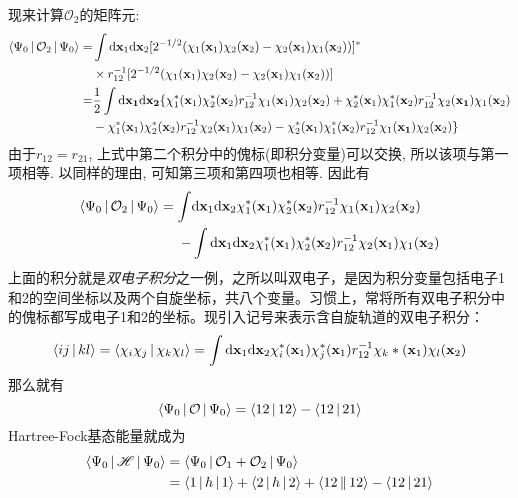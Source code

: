 
现来计算$\mathcal{O}_2$的矩阵元:
\begin{align}
\braket{\Psi_0|\mathcal{O}_2|\Psi_0}=&\int\dd\mathbf{x}_1\dd\mathbf{x}_2[2^{-1/2}(\chi_1(\mathbf{x}_1)\chi_2(\mathbf{x}_2)-\chi_2(\mathbf{x}_1)\chi_1(\mathbf{x}_2))]^*\notag\\
\qquad&\times r_{12}^{-1} [2^{-1/2}(\chi_1(\mathbf{x}_1)\chi_2(\mathbf{x}_2)-\chi_2(\mathbf{x}_1)\chi_1(\mathbf{x}_2))]\notag\\
=&\frac{1}{2}\int\dd{\mathbf{x}_1}\dd{\mathbf{x}_2}\{\chi_1^*(\mathbf{x}_1)\chi_2^*(\mathbf{x}_2)r_{12}^{-1}\chi_1(\mathbf{x}_1)\chi_2(\mathbf{x}_2) + \chi_2^*(\mathbf{x}_1)\chi_1^*(\mathbf{x}_2)r_{12}^{-1}\chi_2(\mathbf{x_1})\chi_1(\mathbf{x}_2) \notag\\
\qquad& - \chi_1^*(\mathbf{x}_1)\chi_2^*(\mathbf{x}_2)r_{12}^{-1}\chi_2(\mathbf{x}_1)\chi_1(\mathbf{x}_2) - \chi_2^*(\mathbf{x}_1)\chi_1^*(\mathbf{x}_2)r_{12}^{-1}\chi_1(\mathbf{x_1})\chi_2(\mathbf{x}_2)
\}
\end{align}
由于$r_{12}=r_{21}$, 上式中第二个积分中的傀标(即积分变量)可以交换, 所以该项与第一项相等. 以同样的理由, 可知第三项和第四项也相等. 因此有
\begin{align}
\braket{\Psi_0|\mathcal{O}_2|\Psi_0}=\int&\dd\mathbf{x}_1\dd\mathbf{x}_2 \chi_1^*(\mathbf{x}_1)\chi_2^*(\mathbf{x}_2)r_{12}^{-1}\chi_1(\mathbf{x}_1)\chi_2(\mathbf{x}_2)\notag\\
 -& \int\dd\mathbf{x}_1\dd\mathbf{x}_2\chi_1^*(\mathbf{x}_1)\chi_2^*(\mathbf{x}_2)r_{12}^{-1}\chi_2(\mathbf{x}_1)\chi_1(\mathbf{x}_2)
\end{align}
上面的积分就是\emph{双电子积分}之一例，之所以叫双电子，是因为积分变量包括电子1和2的空间坐标以及两个自旋坐标，共八个变量。习惯上，常将所有双电子积分中的傀标都写成电子1和2的坐标。现引入记号来表示含自旋轨道的双电子积分：
\begin{equation}
\braket{ij|kl}=\braket{\chi_i\chi_j|\chi_k\chi_l}=\int\dd\mathbf{x}_1\dd\mathbf{x}_2\chi_i^*(\mathbf{x}_1)\chi_j^*(\mathbf{x}_1)r_{12}^{-1}\chi_k*(\mathbf{x}_1)\chi_l(\mathbf{x}_2)
\end{equation}
那么就有
\begin{equation}
\Braket{\Psi_0|\mathcal{O}|\Psi_0}=\Braket{12|12}-\Braket{12|21}
\end{equation}
Hartree-Fock基态能量就成为
\begin{align}
\Braket{\Psi_0|\mathscr{H}|\Psi_0}&=\Braket{\Psi_0|\mathcal{O}_1+\mathcal{O}_2|\Psi_0}\notag\\
&=\Braket{1|h|1}+\Braket{2|h|2}+\Braket{12||12}-\Braket{12|21}
\end{align}

